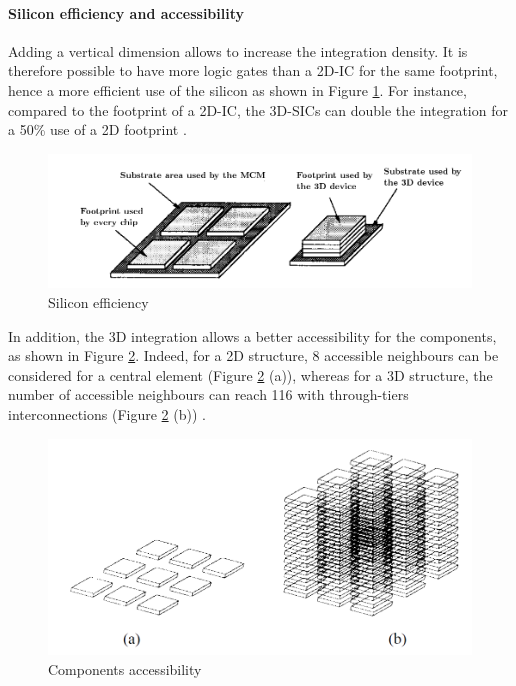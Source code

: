\paragraph{Silicon efficiency and accessibility}

Adding a vertical dimension allows to increase the integration density. It is therefore possible to have more logic gates than a 2D-IC for the same footprint, hence a more efficient use of the silicon as shown in Figure \ref{fig:footprint}. For instance, compared to the footprint of a 2D-IC, the 3D-SICs can double the integration for a 50\% use of a 2D footprint \cite{659500}.

\begin{figure}[h!]
\begin{center}
\includegraphics[width=0.8\linewidth]{footprint.png}
\end{center}
\vspace{-0.5cm}
\caption{Silicon efficiency \cite{659500}}
\label{fig:footprint}
\end{figure}

In addition, the 3D integration allows a better accessibility for the components, as shown in Figure \ref{fig:accessibility}. Indeed, for a 2D structure, 8 accessible neighbours can be considered for a central element (Figure \ref{fig:accessibility} (a)), whereas for a 3D structure, the number of accessible neighbours can reach 116 with through-tiers interconnections (Figure \ref{fig:accessibility} (b)) \cite{659500}.

\begin{figure}[h!]
\begin{center}
\includegraphics[width=0.8\linewidth]{accessibility.png}
\end{center}
\vspace{-0.5cm}
\caption{Components accessibility \cite{659500}}
\label{fig:accessibility}
\end{figure}

